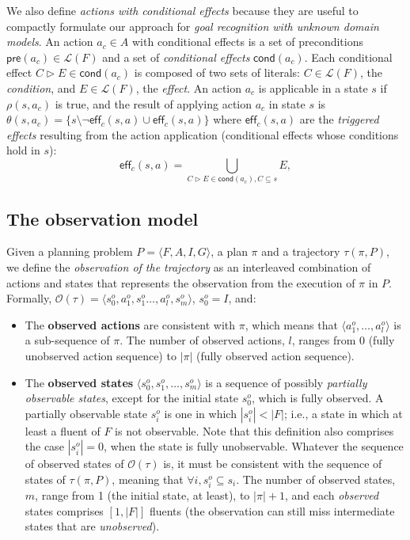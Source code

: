 \documentclass{article}
\newcommand{\tup}[1]{{\langle #1 \rangle}}
\newcommand{\pre}{\mathsf{pre}}     %
\newcommand{\eff}{\mathsf{eff}}     %
\newcommand{\cond}{\mathsf{cond}}   %
\begin{document}
We also define {\em actions with conditional effects} because they are useful to compactly formulate our approach for {\em goal recognition with unknown domain models}. An action $a_c\in A$ with conditional effects is a set of preconditions $\pre(a_c)\in\mathcal{L}(F)$ and a set of {\em conditional effects} $\cond(a_c)$. Each conditional effect $C\rhd E\in\cond(a_c)$ is composed of two sets of literals: $C\in\mathcal{L}(F)$, the {\em condition}, and $E\in\mathcal{L}(F)$, the {\em effect}. An action $a_c$ is applicable in a state $s$ if $\rho(s,a_c)$ is true, and the result of applying action $a_c$ in state $s$ is $\theta(s,a_c)=\{s\setminus\neg\eff_c(s,a)\cup\eff_c(s,a)\}$ where $\eff_c(s,a)$ are the {\em triggered effects} resulting from the action application (conditional effects whose conditions hold in $s$):
\[
\eff_c(s,a)=\bigcup_{C\rhd E\in\cond(a_c),C\subseteq s} E,
\]

\subsection{The observation model}
Given a planning problem $P=\tup{F,A,I,G}$, a plan $\pi$ and a trajectory $\tau(\pi,P)$, we define the \emph{observation of the trajectory} as an interleaved combination of actions and states that represents the observation from the execution of $\pi$ in $P$. Formally, $\mathcal{O}(\tau)=\tup{s_0^o,a_1^o,s_1^o \ldots , a_l^o, s_m^o}$, $s_0^o=I$, and:

\begin{itemize}
\item The {\bf observed actions} are consistent with $\pi$, which means that $\tup{a_1^o, \ldots, a_l^o}$ is a sub-sequence of $\pi$. The number of observed actions, $l$, ranges from $0$ (fully unobserved action sequence) to $|\pi|$ (fully observed action sequence).
\item The {\bf observed states} $\tup{s_0^o, s_1^o, \ldots, s_m^o}$ is a sequence of possibly {\em partially observable states}, except for the initial state $s_0^o$, which is fully observed. A partially observable state $s_i^o$ is one in which $|s_i^o| < |F|$; i.e., a state in which at least a fluent of $F$ is not observable. Note that this definition also comprises the case $|s_i^o| = 0$, when the state is fully unobservable. Whatever the sequence of observed states of $\mathcal{O}(\tau)$ is, it must be consistent with the sequence of states of $\tau(\pi,P)$, meaning that $\forall i, s_i^o \subseteq s_i$. The number of observed states, $m$, range from 1 (the initial state, at least), to $|\pi|+1$, and each {\em observed} states comprises $[1,|F|]$ fluents (the observation can still miss intermediate states that are {\em unobserved}).
\end{itemize}
\end{document}
